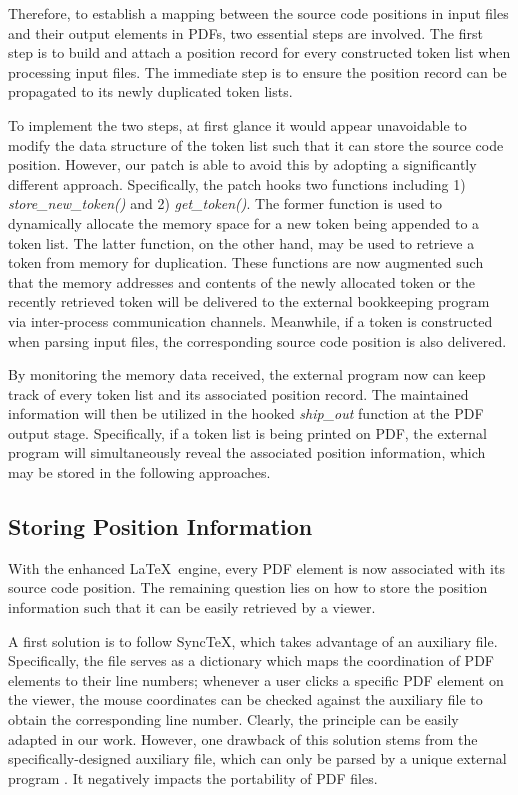 \documentclass[sigconf]{acmart}
\begin{document}
Therefore, to establish a mapping between the source code positions in input files and their output elements in PDFs, two essential steps are involved. 
The first step is to build and attach a position record for every constructed token list when processing input files. 
The immediate step is to ensure the position record can be propagated to its newly duplicated token lists. 

To implement the two steps, at first glance it would appear unavoidable to modify the data structure of the token list such that it can store the source code position. 
However, our patch is able to avoid this by  adopting a significantly different approach. 
Specifically, the patch hooks two functions including 1) \textit{store\_new\_token()} and 2) \textit{get\_token()}. 
The former function  is used to dynamically allocate the memory space for a new token being appended to a token list. 
The latter function, on the other hand, may be used to retrieve a token from memory for duplication. 
These functions are now augmented such that the memory addresses and contents of the newly allocated token or the recently retrieved token will be delivered to the external bookkeeping program via inter-process communication channels. 
Meanwhile, if a token is constructed when parsing input files, the corresponding source code position is also delivered. 

By monitoring the memory data received, the external program now can keep track of every token list and its associated position record. 
The maintained information will then be utilized in the hooked \textit{ship\_out} function at the PDF output stage.
Specifically, if a token list is being printed on PDF, the external program will simultaneously reveal the associated position information, which may be stored in the following approaches.

\subsection{Storing Position Information}
With the enhanced \LaTeX\ engine, every PDF element is now associated with its source code position. The remaining question lies on how to store the position information such that it can be easily retrieved by a viewer.

A first solution is to follow Sync\TeX , which takes advantage of an auxiliary file. 
Specifically, the file serves as a dictionary which maps the coordination of PDF elements to their line numbers; whenever a user clicks a specific PDF element on the viewer, the mouse coordinates can be checked against the auxiliary file to obtain the corresponding line number. 
Clearly, the principle can be easily adapted in our work. 
However, one drawback of this solution stems from the specifically-designed auxiliary file, which can only be parsed by a unique external program \cite{libsynctex2011}. It negatively impacts the portability of PDF files.
\end{document}
